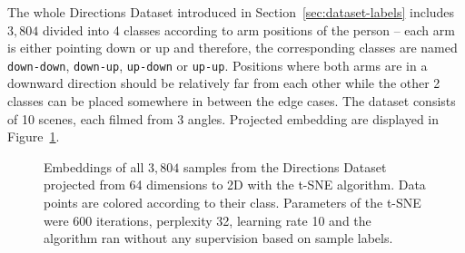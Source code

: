 The whole Directions Dataset introduced in Section~\ref{sec:dataset-labels} includes $3{,}804$ divided into 4 classes according to arm positions of the person -- each arm is either pointing down or up and therefore, the corresponding classes are named \texttt{down-down}, \texttt{down-up}, \texttt{up-down} or \texttt{up-up}. Positions where both arms are in a downward direction should be relatively far from each other while the other 2 classes can be placed somewhere in between the edge cases. The dataset consists of 10 scenes, each filmed from 3 angles. Projected embedding are displayed in Figure~\ref{fig:t-sne}.

\begin{figure}[!ht]
    \centering
    \caption{Embeddings of all $3{,}804$ samples from the Directions Dataset projected from 64 dimensions to 2D with the t-SNE algorithm. Data points are colored according to their class. Parameters of the t-SNE were 600 iterations, perplexity 32, learning rate 10 and the algorithm ran without any supervision based on sample labels.}
    \label{fig:t-sne}
\end{figure}

